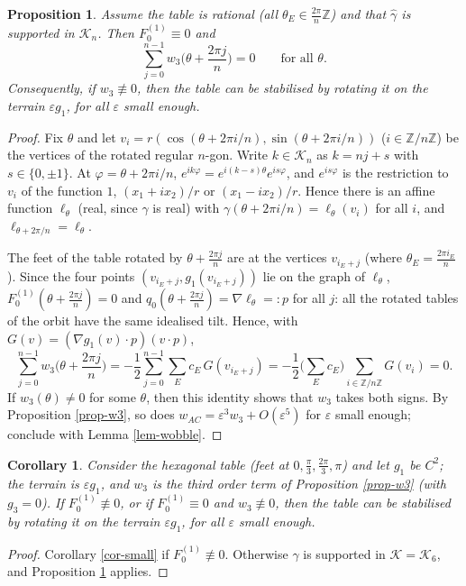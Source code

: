 \documentclass[a4paper,11pt,twoside,leqno]{article}
\newtheorem{prop}[teo]{Proposition}
\newtheorem{cor}[teo]{Corollary}
\newcommand{\eps}[0]{\varepsilon}
\newcommand{\zz}[0]{\ensuremath{\mathbb{Z}}}
\numberwithin{equation}{section}
\begin{document}
\begin{prop}\label{prop-rational}
Assume the table is rational (all $\theta_E \in \frac{2\pi}{n}\zz$) and that $\hat \gamma$ is supported in $\mathcal{K}_n$. Then $F^{(1)}_0 \equiv 0$ and
\[
\sum_{j = 0}^{n-1} w_3\Big( \theta + \frac{2 \pi j}{n}\Big) = 0 \qquad \text{for all } \theta.
\]
Consequently, if $w_3 \not \equiv 0$, then the table can be stabilised by rotating it on the terrain $\eps g_1$, for all $\eps$ small enough.
\end{prop}
\begin{proof}
Fix $\theta$ and let $v_i = r(\cos(\theta + 2\pi i /n), \sin(\theta + 2\pi i /n))$ ($i \in \zz/n\zz$) be the vertices of the rotated regular $n$-gon. Write $k \in \mathcal{K}_n$ as $k = nj + s$ with $s \in \{0,\pm 1\}$. At $\varphi = \theta + 2\pi i/n$, $e^{ik\varphi} = e^{i(k-s)\theta} e^{is\varphi}$, and $e^{is\varphi}$ is the restriction to $v_i$ of the function $1$, $(x_1 + i x_2)/r$ or $(x_1 - ix_2)/r$. Hence there is an affine function $\ell_\theta$ (real, since $\gamma$ is real) with $\gamma(\theta + 2\pi i /n) = \ell_\theta(v_i)$ for all $i$, and $\ell_{\theta + 2\pi/n} = \ell_\theta$.

The feet of the table rotated by $\theta + \frac{2\pi j}{n}$ are at the vertices $v_{i_E + j}$ (where $\theta_E = \frac{2\pi i_E}{n}$). Since the four points $(v_{i_E+j}, g_1(v_{i_E+j}))$ lie on the graph of $\ell_\theta$, $F_0^{(1)}(\theta + \frac{2\pi j}{n}) = 0$ and $q_0(\theta + \frac{2\pi j}{n}) = \nabla \ell_\theta =: p$ for all $j$: all the rotated tables of the orbit have the same idealised tilt. Hence, with $G(v) = (\nabla g_1(v) \cdot p)(v \cdot p)$,
\[
\sum_{j=0}^{n-1} w_3\Big(\theta + \frac{2\pi j}{n}\Big)
= - \frac{1}{2} \sum_{j=0}^{n-1} \sum_E c_E\, G(v_{i_E + j})
= - \frac{1}{2} \Big(\sum_E c_E\Big) \sum_{i \in \zz/n\zz} G(v_i) = 0.
\]
If $w_3(\theta) \neq 0$ for some $\theta$, then this identity shows that $w_3$ takes both signs. By Proposition \ref{prop-w3}, so does $w_{AC} = \eps^3 w_3 + O(\eps^5)$ for $\eps$ small enough; conclude with Lemma \ref{lem-wobble}.
\end{proof}

\begin{cor}\label{cor-hexagon}
Consider the hexagonal table (feet at $0, \frac{\pi}{3}, \frac{2\pi}{3}, \pi$) and let $g_1$ be $C^2$; the terrain is $\eps g_1$, and $w_3$ is the third order term of Proposition \ref{prop-w3} (with $g_3 = 0$). If $F_0^{(1)} \not \equiv 0$, or if $F_0^{(1)} \equiv 0$ and $w_3 \not \equiv 0$, then the table can be stabilised by rotating it on the terrain $\eps g_1$, for all $\eps$ small enough.
\end{cor}
\begin{proof}
Corollary \ref{cor-small} if $F_0^{(1)} \not \equiv 0$. Otherwise $\hat\gamma$ is supported in $\mathcal{K} = \mathcal{K}_6$, and Proposition \ref{prop-rational} applies.
\end{proof}
\end{document}
